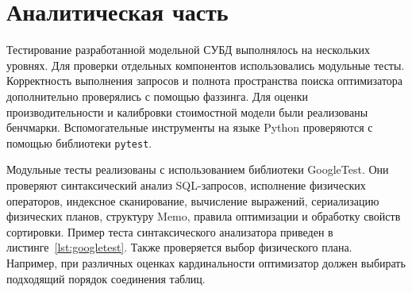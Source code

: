 \documentclass[14pt, russian]{scrartcl}
\begin{document}


\section{Аналитическая часть}

Тестирование разработанной модельной СУБД выполнялось на нескольких уровнях. Для
проверки отдельных компонентов использовались модульные тесты. Корректность
выполнения запросов и полнота пространства поиска оптимизатора дополнительно
проверялись с помощью фаззинга. Для оценки производительности и калибровки
стоимостной модели были реализованы бенчмарки. Вспомогательные инструменты на
языке Python проверяются с помощью библиотеки \verb|pytest|.

Модульные тесты реализованы с использованием библиотеки GoogleTest. Они
проверяют синтаксический анализ SQL-запросов, исполнение физических операторов,
индексное сканирование, вычисление выражений, сериализацию физических планов,
структуру Memo, правила оптимизации и обработку свойств сортировки. Пример теста
синтаксического анализатора приведен в листинге~\ref{lst:googletest}. Также
проверяется выбор физического плана. Например, при различных оценках
кардинальности оптимизатор должен выбирать подходящий порядок соединения таблиц.
\end{document}
